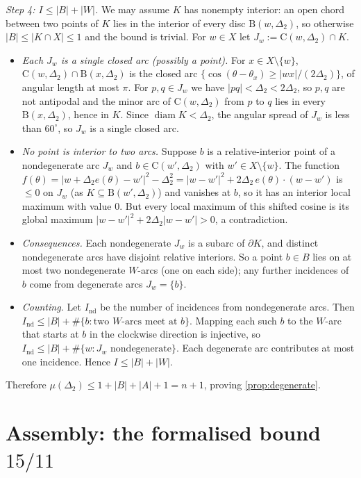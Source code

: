 \documentclass[11pt]{amsart}
\theoremstyle{definition}
\theoremstyle{remark}
\newcommand{\Dt}{\Delta_2}
\newcommand{\mult}{\mu}
\newcommand{\Cc}{\mathrm{C}}      %
\newcommand{\Dd}{\mathrm{B}}      %
\begin{document}
\emph{Step 4: $I\le|B|+|W|$.} We may assume $K$ has nonempty interior: an open chord between two points of $K$ lies in the interior of every disc $\Dd(w,\Dt)$, so otherwise $|B|\le|K\cap X|\le1$ and the bound is trivial. For $w\in X$ let $J_w:=\Cc(w,\Dt)\cap K$.
\begin{itemize}[leftmargin=2em]
\item \emph{Each $J_w$ is a single closed arc (possibly a point).} For $x\in X\setminus\{w\}$, $\Cc(w,\Dt)\cap\Dd(x,\Dt)$ is the closed arc $\{\cos(\theta-\theta_x)\ge|wx|/(2\Dt)\}$, of angular length at most $\pi$. For $p,q\in J_w$ we have $|pq|<\Dt<2\Dt$, so $p,q$ are not antipodal and the minor arc of $\Cc(w,\Dt)$ from $p$ to $q$ lies in every $\Dd(x,\Dt)$, hence in $K$. Since $\operatorname{diam}K<\Dt$, the angular spread of $J_w$ is less than $60^\circ$, so $J_w$ is a single closed arc.
\item \emph{No point is interior to two arcs.} Suppose $b$ is a relative-interior point of a nondegenerate arc $J_w$ and $b\in\Cc(w',\Dt)$ with $w'\in X\setminus\{w\}$. The function $f(\theta)=|w+\Dt e(\theta)-w'|^2-\Dt^2=|w-w'|^2+2\Dt\,e(\theta)\cdot(w-w')$ is $\le0$ on $J_w$ (as $K\subseteq\Dd(w',\Dt)$) and vanishes at $b$, so it has an interior local maximum with value $0$. But every local maximum of this shifted cosine is its global maximum $|w-w'|^2+2\Dt|w-w'|>0$, a contradiction.
\item \emph{Consequences.} Each nondegenerate $J_w$ is a subarc of $\partial K$, and distinct nondegenerate arcs have disjoint relative interiors. So a point $b\in B$ lies on at most two nondegenerate $W$-arcs (one on each side); any further incidences of $b$ come from degenerate arcs $J_w=\{b\}$.
\item \emph{Counting.} Let $I_{\mathrm{nd}}$ be the number of incidences from nondegenerate arcs. Then $I_{\mathrm{nd}}\le|B|+\#\{b:\text{two $W$-arcs meet at }b\}$. Mapping each such $b$ to the $W$-arc that starts at $b$ in the clockwise direction is injective, so $I_{\mathrm{nd}}\le|B|+\#\{w:J_w\text{ nondegenerate}\}$. Each degenerate arc contributes at most one incidence. Hence $I\le|B|+|W|$.
\end{itemize}
Therefore $\mult(\Dt)\le1+|B|+|A|+1=n+1$, proving \cref{prop:degenerate}.


\section{Assembly: the formalised bound \texorpdfstring{$15/11$}{15/11}}\label{sec:assembly}
\end{document}
